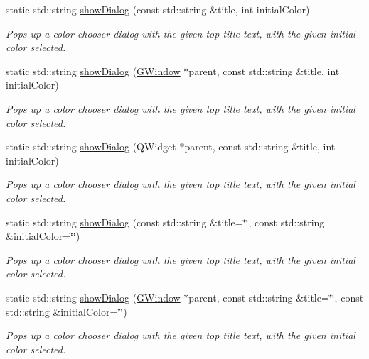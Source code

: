 \begin{DoxyCompactItemize}
\item 
static std\+::string \mbox{\hyperlink{classsgl_1_1GColorChooser_a606489cbaca9144ee0a8e22d7646182a}{show\+Dialog}} (const std\+::string \&title, int initial\+Color)
\begin{DoxyCompactList}\small\item\em Pops up a color chooser dialog with the given top title text, with the given initial color selected. \end{DoxyCompactList}\item 
static std\+::string \mbox{\hyperlink{classsgl_1_1GColorChooser_a2c513cab2b8e569b35327f89117b077f}{show\+Dialog}} (\mbox{\hyperlink{classsgl_1_1GWindow}{G\+Window}} $\ast$parent, const std\+::string \&title, int initial\+Color)
\begin{DoxyCompactList}\small\item\em Pops up a color chooser dialog with the given top title text, with the given initial color selected. \end{DoxyCompactList}\item 
static std\+::string \mbox{\hyperlink{classsgl_1_1GColorChooser_a8bac6bfe2b583f676c2ede745053fff6}{show\+Dialog}} (Q\+Widget $\ast$parent, const std\+::string \&title, int initial\+Color)
\begin{DoxyCompactList}\small\item\em Pops up a color chooser dialog with the given top title text, with the given initial color selected. \end{DoxyCompactList}\item 
static std\+::string \mbox{\hyperlink{classsgl_1_1GColorChooser_ab649c9d45542c25fa22096c5afa831e7}{show\+Dialog}} (const std\+::string \&title=\char`\"{}\char`\"{}, const std\+::string \&initial\+Color=\char`\"{}\char`\"{})
\begin{DoxyCompactList}\small\item\em Pops up a color chooser dialog with the given top title text, with the given initial color selected. \end{DoxyCompactList}\item 
static std\+::string \mbox{\hyperlink{classsgl_1_1GColorChooser_a38b9e47e162e84e985c38c7a8ab69278}{show\+Dialog}} (\mbox{\hyperlink{classsgl_1_1GWindow}{G\+Window}} $\ast$parent, const std\+::string \&title=\char`\"{}\char`\"{}, const std\+::string \&initial\+Color=\char`\"{}\char`\"{})
\begin{DoxyCompactList}\small\item\em Pops up a color chooser dialog with the given top title text, with the given initial color selected. \end{DoxyCompactList}\item 

\end{DoxyCompactItemize}
